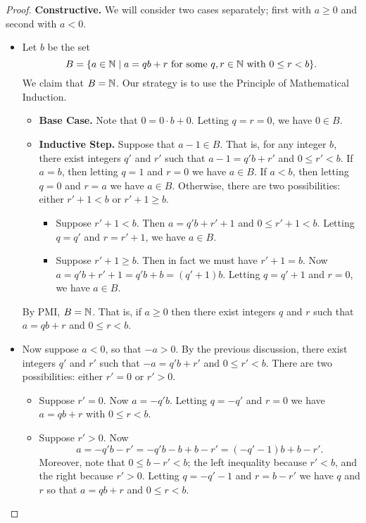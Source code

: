 \begin{proof}
\textbf{Constructive.} We will consider two cases separately; first with \(a \geq 0\) and second with \(a < 0\).

\begin{itemize}
\item Let \(b\) be the set \[ B = \{ a \in \mathbb{N} \mid a = qb + r\ \mathrm{for\ some}\ q,r \in \mathbb{N}\ \mathrm{with}\ 0 \leq r < b \}. \] We claim that \(B = \mathbb{N}\). Our strategy is to use the Principle of Mathematical Induction.
\begin{itemize}
\item \textbf{Base Case.} Note that \(0 = 0 \cdot b + 0\). Letting \(q = r = 0\), we have \(0 \in B\).
\item \textbf{Inductive Step.} Suppose that \(a-1 \in B\). That is, for any integer \(b\), there exist integers \(q'\) and \(r'\) such that \(a-1 = q'b + r'\) and \(0 \leq r' < b\). If \(a = b\), then letting \(q = 1\) and \(r = 0\) we have \(a \in B\). If \(a < b\), then letting \(q = 0\) and \(r = a\) we have \(a \in B\). Otherwise, there are two possibilities: either \(r'+1 < b\) or \(r'+1 \geq b\).
\begin{itemize}
\item Suppose \(r'+1 < b\). Then \(a = q'b + r'+1\) and \(0 \leq r'+1 < b\). Letting \(q = q'\) and \(r = r'+1\), we have \(a \in B\).
\item Suppose \(r'+1 \geq b\). Then in fact we must have \(r'+1 = b\). Now \(a = q'b + r'+1 = q'b + b = (q'+1)b\). Letting \(q = q'+1\) and \(r = 0\), we have \(a \in B\).
\end{itemize}
\end{itemize}
By PMI, \(B = \mathbb{N}\). That is, if \(a \geq 0\) then there exist integers \(q\) and \(r\) such that \(a = qb + r\) and \(0 \leq r < b\).

\item Now suppose \(a < 0\), so that \(-a > 0\). By the previous discussion, there exist integers \(q'\) and \(r'\) such that \(-a = q'b + r'\) and \(0 \leq r' < b\). There are two possibilities: either \(r' = 0\) or \(r' > 0\).
\begin{itemize}
\item Suppose \(r' = 0\). Now \(a = -q'b\). Letting \(q = -q'\) and \(r = 0\) we have \(a = qb+r\) with \(0 \leq r < b\).
\item Suppose \(r' > 0\). Now \[ a = -q'b - r'= -q'b - b + b - r' = (-q'-1)b + b-r'. \] Moreover, note that \(0 \leq b-r' < b\); the left inequality because \(r' < b\), and the right because \(r' > 0\). Letting \(q = -q'-1\) and \(r = b-r'\) we have \(q\) and \(r\) so that \(a = qb+r\) and \(0 \leq r < b\). \qedhere
\end{itemize}
\end{itemize}
\end{proof}

